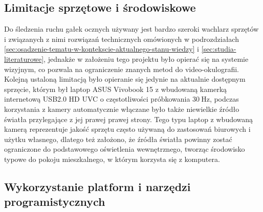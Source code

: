 \documentclass[a4paper,twoside,12pt]{book}
\begin{document}
\subsection{Limitacje sprzętowe i środowiskowe}
\label{subsec:Limitacje-sprzetowe-i-srodowiskowe}

Do śledzenia ruchu gałek ocznych używany jest bardzo szeroki wachlarz sprzętów i związanych z nimi rozwiązań technicznych omówionych w podrozdziałach \ref{sec:osadzenie-tematu-w-kontekscie-aktualnego-stanu-wiedzy} i \ref{sec:studia-literaturowe}, jednakże w założeniu tego projektu było opierać się na systemie wizyjnym, co pozwala na ograniczenie znanych metod do video-okulografii. Kolejną ustaloną limitacją było opieranie się jedynie na aktualnie dostępnym sprzęcie, którym był laptop ASUS Vivobook 15 z wbudowaną kamerką internetową USB2.0 HD UVC o częstotliwości próbkowania $30 \ \unit{\hertz}$, podczas korzystania z kamery automatycznie włączane było także niewielkie źródło światła przylegające z jej prawej prawej strony. Tego typu laptop z wbudowaną kamerą reprezentuje jakość sprzętu często używaną do zastosowań biurowych i użytku własnego, dlatego też założono, że źródła światła powinny zostać ograniczone do podstawowego oświetlenia wewnętrznego, tworząc środowisko typowe do pokoju mieszkalnego, w którym korzysta się z komputera.

\subsection{Wykorzystanie platform i narzędzi programistycznych}
\label{subsec:Wykorzystanie-platform-i-narzedzi-programistycznych}
\end{document}
